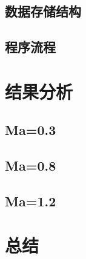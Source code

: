 \documentclass[UTF8]{ctexart}
\begin{document}
\subsection{数据存储结构}

\subsection{程序流程}

\section{结果分析}

\subsection{Ma=0.3}

\subsection{Ma=0.8}

\subsection{Ma=1.2}

\section{总结}
\end{document}
